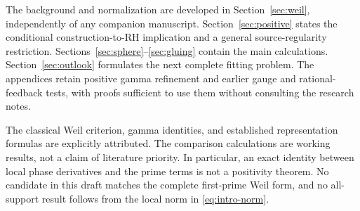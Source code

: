 The background and normalization are developed in
Section~\ref{sec:weil}, independently of any companion manuscript.
Section~\ref{sec:positive} states the conditional construction-to-RH
implication and a general source-regularity restriction.
Sections~\ref{sec:sphere}--\ref{sec:gluing} contain the main calculations.
Section~\ref{sec:outlook} formulates the next complete fitting problem.
The appendices retain positive gamma refinement and earlier gauge and
rational-feedback tests, with proofs sufficient to use them without
consulting the research notes.

The classical Weil criterion, gamma identities, and established
representation formulas are explicitly attributed. The comparison
calculations are working results, not a claim of literature priority.
In particular, an exact identity between local phase derivatives and
the prime terms is not a positivity theorem. No candidate in this draft
matches the complete first-prime Weil form, and no all-support result
follows from the local norm in \eqref{eq:intro-norm}.
